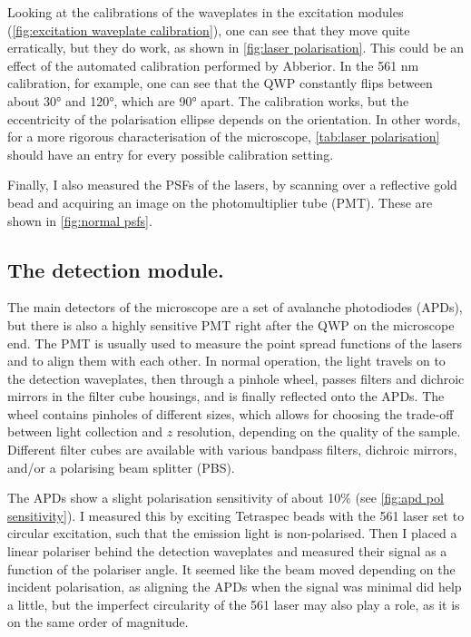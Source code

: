 Looking at the calibrations of the waveplates in the excitation modules (\autoref{fig:excitation waveplate calibration}), one can see that they move quite erratically, but they do work, as shown in \autoref{fig:laser polarisation}. This could be an effect of the automated calibration performed by Abberior. In the 561 nm calibration, for example, one can see that the QWP constantly flips between about \ang{30} and \ang{120}, which are \ang{90} apart. The calibration works, but the eccentricity of the polarisation ellipse depends on the orientation. In other words, for a more rigorous characterisation of the microscope, \autoref{tab:laser polarisation} should have an entry for every possible calibration setting.

Finally, I also measured the PSFs of the lasers, by scanning over a reflective gold bead and acquiring an image on the photomultiplier tube (PMT). These are shown in \autoref{fig:normal psfs}.

\subsection{The detection module.} The main detectors of the microscope are a set of avalanche photodiodes (APDs), but there is also a highly sensitive PMT right after the QWP on the microscope end. The PMT is usually used to measure the point spread functions of the lasers and to align them with each other. In normal operation, the light travels on to the detection waveplates, then through a pinhole wheel, passes filters and dichroic mirrors in the filter cube housings, and is finally reflected onto the APDs. The wheel contains pinholes of different sizes, which allows for choosing the trade-off between light collection and $ z $ resolution, depending on the quality of the sample. Different filter cubes are available with various bandpass filters, dichroic mirrors, and/or a polarising beam splitter (PBS).

The APDs show a slight polarisation sensitivity of about 10\% (see \autoref{fig:apd pol sensitivity}). I measured this by exciting Tetraspec beads with the 561 laser set to circular excitation, such that the emission light is non-polarised. Then I placed a linear polariser behind the detection waveplates and measured their signal as a function of the polariser angle. It seemed like the beam moved depending on the incident polarisation, as aligning the APDs when the signal was minimal did help a little, but the imperfect circularity of the 561 laser may also play a role, as it is on the same order of magnitude. 

